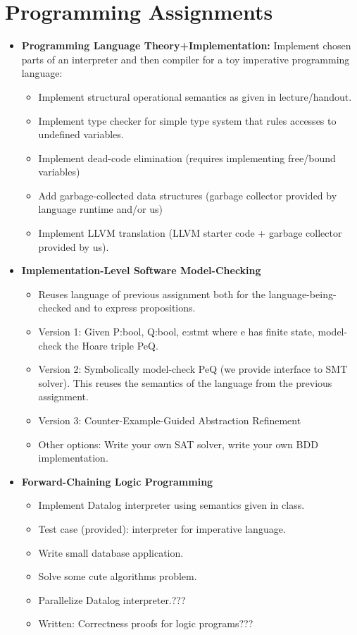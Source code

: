 \documentclass{article}
\begin{document}
\section*{Programming Assignments}
\begin{itemize}
\item 
\textbf{Programming Language Theory+Implementation:}
Implement chosen parts of an interpreter and then compiler for a toy imperative programming language:
\begin{itemize}
\item Implement structural operational semantics as given in lecture/handout.
\item Implement type checker for simple type system that rules accesses to undefined variables.
\item Implement dead-code elimination (requires implementing free/bound variables)
\item Add garbage-collected data structures (garbage collector provided by language runtime and/or us)
\item Implement LLVM translation (LLVM starter code + garbage collector provided by us).
\end{itemize}
 
 \item
 \textbf{Implementation-Level Software Model-Checking}
 \begin{itemize}
  \item Reuses language of previous assignment both for the language-being-checked and to express propositions.
  \item Version 1: Given P:bool, Q:bool, e:stmt where e has finite state, model-check the Hoare triple {P}e{Q}.
  \item Version 2: Symbolically model-check {P}e{Q} (we provide interface to SMT solver). This reuses the semantics of the language from the previous assignment.
  \item Version 3: Counter-Example-Guided Abstraction Refinement 
  \item Other options: Write your own SAT solver, write your own BDD implementation.
 \end{itemize}
 
 \item
 \textbf{Forward-Chaining Logic Programming}
 \begin{itemize}
 \item Implement Datalog interpreter using semantics given in class.
 \item Test case (provided): interpreter for imperative language.
 \item Write small database application.
 \item Solve some cute algorithms problem.
 \item Parallelize Datalog interpreter.???
 \item Written: Correctness proofs for logic programs???
 \end{itemize}


\end{itemize}
\end{document}
